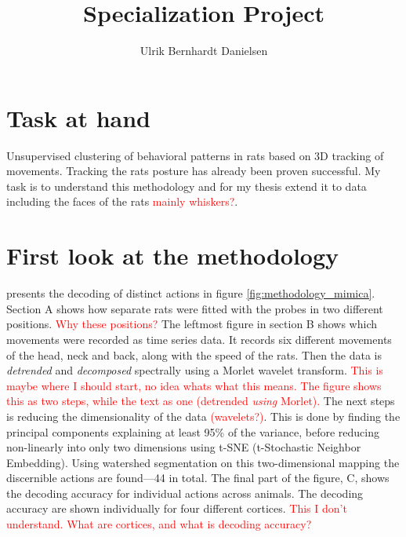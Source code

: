 \documentclass{article}
\title{Specialization Project}
\author{Ulrik Bernhardt Danielsen}
\theoremstyle{plain}
\theoremstyle{definition}
\theoremstyle{remark}
\begin{document}
\maketitle


\section{Task at hand}
Unsupervised clustering of behavioral patterns in rats based on 3D tracking of movements.
Tracking the rats posture has already been proven successful.
My task is to understand this methodology and for my thesis extend it to data including the faces of the rats \textcolor{red}{mainly whiskers?}.


\section{First look at the methodology}
\cite{mimica} presents the decoding of distinct actions in figure \ref{fig:methodology_mimica}.
Section A shows how separate rats were fitted with the probes in two different positions.
\textcolor{red}{Why these positions?} The leftmost figure in section B shows which movements were recorded as time series data.
It records six different movements of the head, neck and back, along with the speed of the rats.
Then the data is \textit{detrended} and \textit{decomposed} spectrally using a Morlet wavelet transform. 
\textcolor{red}{This is maybe where I should start, no idea whats what this means.
The figure shows this as two steps, while the text as one (detrended \textit{using} Morlet).}
The next steps is reducing the dimensionality of the data \textcolor{red}{(wavelets?)}.  
This is done by finding the principal components explaining at least 95\% of the variance, before reducing non-linearly into only two dimensions using t-SNE (t-Stochastic Neighbor Embedding).
Using watershed segmentation on this two-dimensional mapping the discernible actions are found—44 in total.
The final part of the figure, C, shows the decoding accuracy for individual actions across animals.
The decoding accuracy are shown individually for four different cortices. 
\textcolor{red}{This I don't understand.
What are cortices, and what is decoding accuracy?}
\end{document}

